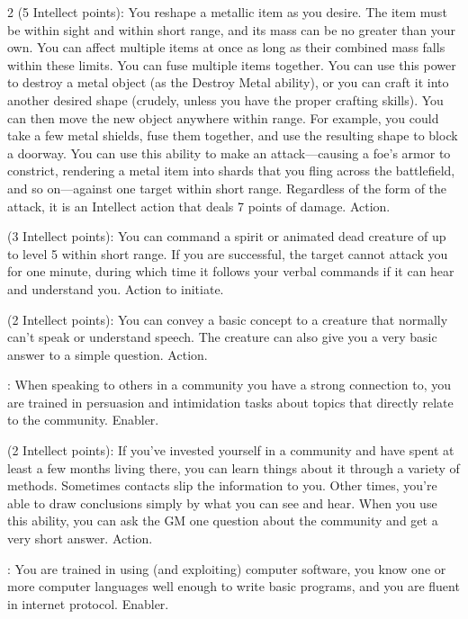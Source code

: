 \begin{multicols}{2}
 (5 Intellect points): You reshape a metallic item as you desire. The item must be within sight and within short range, and its mass can be no greater than your own. You can affect multiple items at once as long as their combined mass falls within these limits. You can fuse multiple items together. You can use this power to destroy a metal object (as the Destroy Metal ability), or you can craft it into another desired shape (crudely, unless you have the proper crafting skills). You can then move the new object anywhere within range. For example, you could take a few metal shields, fuse them together, and use the resulting shape to block a doorway. You can use this ability to make an attack—causing a foe’s armor to constrict, rendering a metal item into shards that you fling across the battlefield, and so on—against one target within short range. Regardless of the form of the attack, it is an Intellect action that deals 7 points of damage. Action. 

 (3 Intellect points): You can command a spirit or animated dead creature of up to level 5 within short range. If you are successful, the target cannot attack you for one minute, during which time it follows your verbal commands if it can hear and understand you. Action to initiate. 

 (2 Intellect points): You can convey a basic concept to a creature that normally can’t speak or understand speech. The creature can also give you a very basic answer to a simple question. Action.

: When speaking to others in a community you have a strong connection to, you are trained in persuasion and intimidation tasks about topics that directly relate to the community. Enabler.

 (2 Intellect points): If you’ve invested yourself in a community and have spent at least a few months living there, you can learn things about it through a variety of methods. Sometimes contacts slip the information to you. Other times, you’re able to draw conclusions simply by what you can see and hear. When you use this ability, you can ask the GM one question about the community and get a very short answer. Action.

: You are trained in using (and exploiting) computer software, you know one or more computer languages well enough to write basic programs, and you are fluent in internet protocol. Enabler. 


\end{multicols}
